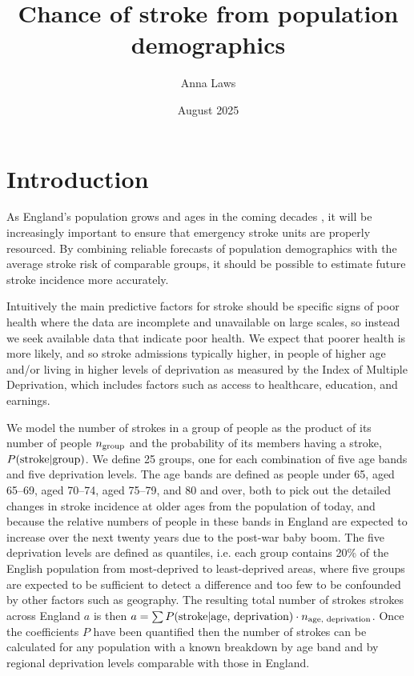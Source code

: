 \documentclass[12pt]{extarticle}
\title{Chance of stroke from population demographics}
\author{Anna Laws}
\date{August 2025}
\begin{document}
\maketitle



\section{Introduction}

As England’s population grows and ages in the coming decades \cite{projections_2025}, it will be increasingly important to ensure that emergency stroke units are properly resourced. By combining reliable forecasts of population demographics with the average stroke risk of comparable groups, it should be possible to estimate future stroke incidence more accurately.


Intuitively the main predictive factors for stroke should be specific signs of poor health where the data are incomplete and unavailable on large scales,
so instead we seek available data that indicate poor health.
% 
We expect that poorer health is more likely, and so stroke admissions typically higher, in people of higher age and/or living in higher levels of deprivation as measured by the Index of Multiple Deprivation, which includes factors such as access to healthcare, education, and earnings. 


We model the number of strokes in a group of people as the product of its number of people $n_{\textnormal{group}}$ and the probability of its members having a stroke, $P(\textnormal{stroke} | \textnormal{group})$.
We define 25 groups, one for each combination of five age bands and five deprivation levels.
The age bands are defined as people under 65, aged 65--69, aged 70--74, aged 75--79, and 80 and over,
both to pick out the detailed changes in stroke incidence at older ages from the population of today, 
and because the relative numbers of people in these bands in England are expected to increase over the next twenty years due to the post-war baby boom.
The five deprivation levels are defined as quantiles, i.e. each group contains 20\% of the English population from most-deprived to least-deprived areas,
where five groups are expected to be sufficient to detect a difference and too few to be confounded by other factors such as geography.
% 
The resulting total number of strokes strokes across England $a$ is then
$a = \sum P(\textnormal{stroke} | \textnormal{age, deprivation}) \cdot n_{\textnormal{age, deprivation}}$.
% 
Once the coefficients $P$ have been quantified then the number of strokes can be calculated for any population with a known breakdown by age band and by regional deprivation levels comparable with those in England. %
\end{document}
